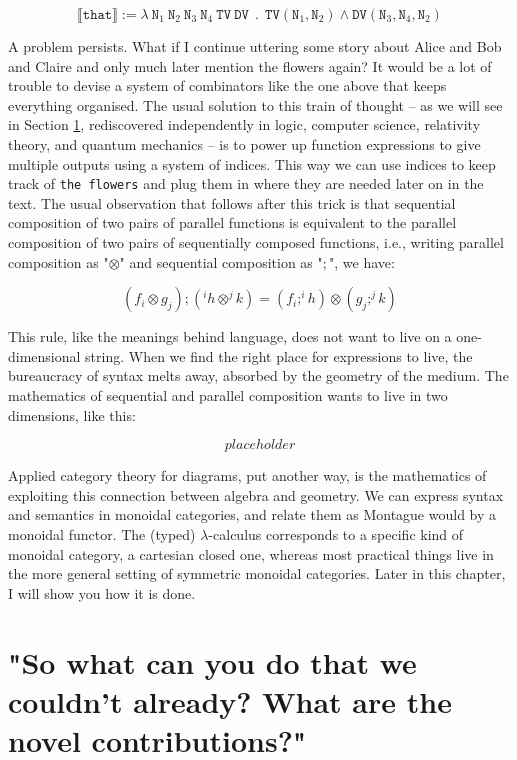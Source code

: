\[\llbracket \texttt{that} \rrbracket := \lambda \ \texttt{N}_1 \ \texttt{N}_2 \ \texttt{N}_3 \ \texttt{N}_4 \ \texttt{TV} \ \texttt{DV} \ \ . \ \ \texttt{TV}(\texttt{N}_1,\texttt{N}_2) \wedge \texttt{DV}(\texttt{N}_3,\texttt{N}_4,\texttt{N}_2)\]

A problem persists. What if I continue uttering some story about Alice and Bob and Claire and only much later mention the flowers again? It would be a lot of trouble to devise a system of combinators like the one above that keeps everything organised. The usual solution to this train of thought -- as we will see in Section \ref{}, rediscovered independently in logic, computer science, relativity theory, and quantum mechanics -- is to power up function expressions to give multiple outputs using a system of indices. This way we can use indices to keep track of \texttt{the flowers} and plug them in where they are needed later on in the text. The usual observation that follows after this trick is that sequential composition of two pairs of parallel functions is equivalent to the parallel composition of two pairs of sequentially composed functions, i.e., writing parallel composition as "$\otimes$" and sequential composition as "$;$", we have:

\[(f_i \otimes g_j) ; (^{i}h \otimes ^{j}k) = (f_i ; ^{i}h) \otimes (g_j ; ^{j}k)\]

This rule, like the meanings behind language, does not want to live on a one-dimensional string. When we find the right place for expressions to live, the bureaucracy of syntax melts away, absorbed by the geometry of the medium. The mathematics of sequential and parallel composition wants to live in two dimensions, like this:

\[placeholder\]

Applied category theory for diagrams, put another way, is the mathematics of exploiting this connection between algebra and geometry. We can express syntax and semantics in monoidal categories, and relate them as Montague would by a monoidal functor. The (typed) $\lambda$-calculus corresponds to a specific kind of monoidal category, a cartesian closed one, whereas most practical things live in the more general setting of symmetric monoidal categories. Later in this chapter, I will show you how it is done.

\section{"So what can you do that we couldn't already? What are the novel contributions?"}

